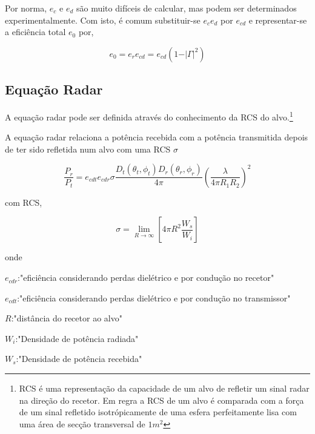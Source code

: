 Por norma, $e_{c}$ e $e_{d}$ são muito difíceis de calcular, mas podem ser determinados experimentalmente. Com isto, é comum substituir-se $e_{c}e_{d}$ por $e_{cd}$ e representar-se a eficiência total $e_{0}$ por,

\begin{equation} \label{3.22}
e_{0}=e_{r}e_{cd}=e_{cd}\left( 1-\vert\Gamma\vert^{2}\right)
\end{equation}






\subsection*{Equação Radar} \label{subcap:eqradar}
A equação radar pode ser definida através do conhecimento da \gls{RCS} do alvo.\footnote{\gls{RCS} é uma representação da capacidade de um alvo de refletir um sinal radar na direção do recetor. Em regra a \gls{RCS} de um alvo é comparada com a força de um sinal refletido isotrópicamente de uma esfera perfeitamente lisa com uma área de secção transversal de $1m^{2}$ }\par 
A equação radar relaciona a potência recebida com a potência transmitida depois de ter sido refletida num alvo com uma \gls{RCS} $\sigma$

\begin{equation} \label{3.26}
\dfrac{P_{r}}{P_{t}}=e_{cdt}e_{cdr}\sigma \dfrac{D_{t}\left( \theta_{t},\phi_{t}\right)D_{r}\left( \theta_{r},\phi_{r}\right) }{4\pi}\left( \dfrac{\lambda}{4\pi R_{1}R_{2}}\right)^{2} 
\end{equation}

com \gls{RCS},

\begin{equation} \label{3.27}
\sigma =\lim_{R\to\infty}\left[ 4\pi R^{2}\dfrac{W_{s}}{W_{i}}\right] 
\end{equation}

onde \par 
$e_{cdr}$:"eficiência considerando perdas dielétrico e por condução no recetor" \par
$e_{cdt}$:"eficiência considerando perdas dielétrico e por condução no transmissor" \par
$R$:"distância do recetor ao alvo" \par
$W_{i}$:"Densidade de potência radiada" \par
$W_{s}$:"Densidade de potência recebida" \par

